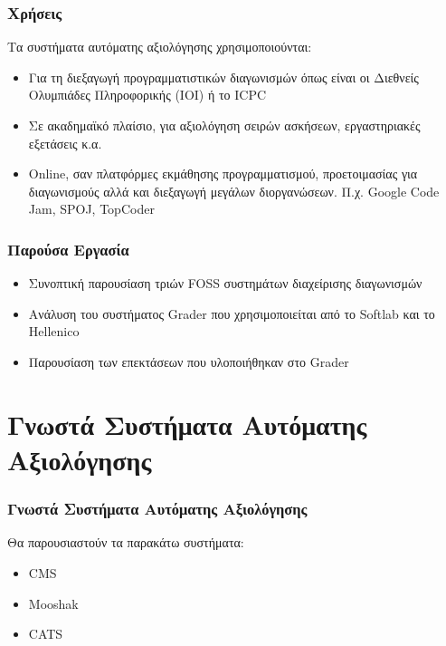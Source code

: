 \documentclass{beamer}
\begin{document}
\begin{frame}
  \frametitle{Χρήσεις}

  Τα συστήματα αυτόματης αξιολόγησης χρησιμοποιούνται:

  \bigskip

  \begin{itemize}
      \item Για τη διεξαγωγή προγραμματιστικών διαγωνισμών όπως είναι οι Διεθνείς
        Ολυμπιάδες Πληροφορικής (IOI) ή το ICPC
      \item Σε ακαδημαϊκό πλαίσιο, για αξιολόγηση σειρών ασκήσεων, εργαστηριακές
        εξετάσεις κ.α.
      \item Online, σαν πλατφόρμες εκμάθησης προγραμματισμού, προετοιμασίας για
        διαγωνισμούς αλλά και διεξαγωγή μεγάλων διοργανώσεων. Π.χ. Google Code Jam,
        SPOJ, TopCoder
  \end{itemize}
\end{frame}


\begin{frame}
  \frametitle{Παρούσα Εργασία}

  \begin{itemize}
      \item Συνοπτική παρουσίαση τριών FOSS συστημάτων διαχείρισης διαγωνισμών
        \bigskip
      \item Ανάλυση του συστήματος Grader που χρησιμοποιείται από το Softlab και το Hellenico
        \bigskip
      \item Παρουσίαση των επεκτάσεων που υλοποιήθηκαν στο Grader
  \end{itemize}
\end{frame}

\section{Γνωστά Συστήματα Αυτόματης Αξιολόγησης}
\begin{frame}
  \frametitle{Γνωστά Συστήματα Αυτόματης Αξιολόγησης}
  Θα παρουσιαστούν τα παρακάτω συστήματα:

  \bigskip

  \begin{itemize}
      \item CMS
      \item Mooshak
      \item CATS
  \end{itemize}
\end{frame}
\end{document}
